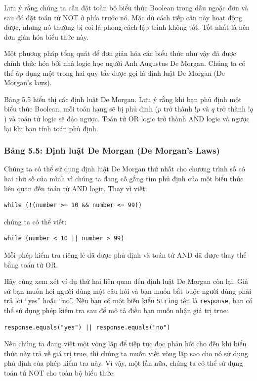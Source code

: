Lưu ý rằng chúng ta cần đặt toàn bộ biểu thức Boolean trong dấu ngoặc đơn và sau đó đặt toán tử NOT ở phía trước nó. Mặc dù cách tiếp cận này hoạt động được, nhưng nó thường bị coi là phong cách lập trình không tốt. Tốt nhất là nên đơn giản hóa biểu thức này.

Một phương pháp tổng quát để đơn giản hóa các biểu thức như vậy đã được chính thức hóa bởi nhà logic học người Anh Augustus De Morgan. Chúng ta có thể áp dụng một trong hai quy tắc được gọi là định luật De Morgan (De Morgan's laws).

Bảng 5.5 hiển thị các định luật De Morgan. Lưu ý rằng khi bạn phủ định một biểu thức Boolean, mỗi toán hạng sẽ bị phủ định ($p$ trở thành $!p$ và $q$ trở thành $!q$) và toán tử logic sẽ đảo ngược. Toán tử OR logic trở thành AND logic và ngược lại khi bạn tính toán phủ định.

\subsubsection*{Bảng 5.5: Định luật De Morgan (De Morgan's Laws)}

Chúng ta có thể sử dụng định luật De Morgan thứ nhất cho chương trình số có hai chữ số của mình vì chúng ta đang cố gắng tìm phủ định của một biểu thức liên quan đến toán tử AND logic. Thay vì viết:

\begin{verbatim}
while (!(number >= 10 && number <= 99))
\end{verbatim}

chúng ta có thể viết:

\begin{verbatim}
while (number < 10 || number > 99)
\end{verbatim}

Mỗi phép kiểm tra riêng lẻ đã được phủ định và toán tử AND đã được thay thế bằng toán tử OR.

Hãy cùng xem xét ví dụ thứ hai liên quan đến định luật De Morgan còn lại. Giả sử bạn muốn hỏi người dùng một câu hỏi và bạn muốn bắt buộc người dùng phải trả lời ``yes'' hoặc ``no''. Nếu bạn có một biến kiểu \texttt{String} tên là \texttt{response}, bạn có thể sử dụng phép kiểm tra sau để mô tả điều bạn muốn nhận giá trị true:

\begin{verbatim}
response.equals("yes") || response.equals("no")
\end{verbatim}

Nếu chúng ta đang viết một vòng lặp để tiếp tục đọc phản hồi cho đến khi biểu thức này trả về giá trị true, thì chúng ta muốn viết vòng lặp sao cho nó sử dụng phủ định của phép kiểm tra này. Vì vậy, một lần nữa, chúng ta có thể sử dụng toán tử NOT cho toàn bộ biểu thức:

